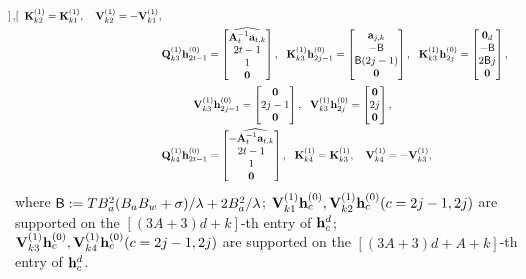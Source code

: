 \begin{align*}
\begin{bmatrix}
    \end{bmatrix},~~  \bK^{(1)}_{k2}=\bK^{(1)}_{k1},~~  \ \bV^{(1)}_{k2}=-\bV^{(1)}_{k1},\\
    &
    \bQ^{(1)}_{k3}\bh^{(0)}_{2t-1}=\begin{bmatrix}
        \widehat{\bA_t^{-1}\ba_{t,k}} \\2t-1\\ 1\\\bzero
    \end{bmatrix},~~ \bK^{(1)}_{k3}\bh^{(0)}_{2j-1}=\begin{bmatrix}
        \ba_{j,k}\\  -\tfthres \\ \tfthres (2j-1)\\\bzero
    \end{bmatrix},~~
    \bK^{(1)}_{k3}\bh^{(0)}_{2j}=\begin{bmatrix}
        \bzero_d\\  -\tfthres \\ 2\tfthres j\\\bzero
    \end{bmatrix},\\
    &
    \qquad~~~ \bV^{(1)}_{k3}\bh^{(0)}_{2j-1}=\begin{bmatrix}
        \bzero\\ 2j-1 \\ \bzero
    \end{bmatrix},~~ \bV^{(1)}_{k3}\bh^{(0)}_{2j}=\begin{bmatrix}
        \bzero\\ 2j \\ \bzero
    \end{bmatrix},\\
    &
    \bQ^{(1)}_{k4}\bh^{(0)}_{2t-1}=\begin{bmatrix}
        - \widehat{\bA_t^{-1}\ba_{t,k}} \\2t-1\\1\\\bzero
    \end{bmatrix},~~  \bK^{(1)}_{k4}=\bK^{(1)}_{k3},~~  \ \bV^{(1)}_{k4}=-\bV^{(1)}_{k3},
\end{align*}
where ${\mathsf{B}}:=TB_a^2(B_aB_w+\sigma)/\lambda+2B_a^2/\lambda$; ${\mathbf V}^{(1)}_{k1}{\mathbf h}^{(0)}_{c},{\mathbf V}^{(1)}_{k2}{\mathbf h}^{(0)}_{c} (c=2j-1,2j)$ are supported on the $[(3A+3)d+k]$-th entry of ${\mathbf h}_c^{{d}}$; ${\mathbf V}^{(1)}_{k3}{\mathbf h}^{(0)}_{c},{\mathbf V}^{(1)}_{k4}{\mathbf h}^{(0)}_{c} (c=2j-1,2j)$ are supported on the $[(3A+3)d+A+k]$-th entry of ${\mathbf h}_c^{{d}}$.

